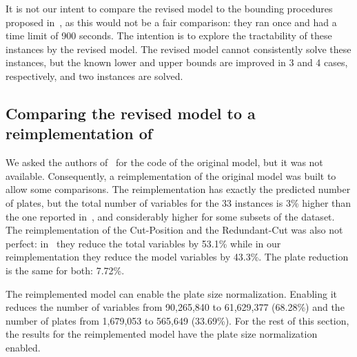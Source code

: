 \documentclass[smallextended]{svjour3}       %
\begin{document}
It is not our intent to compare the revised model to the bounding procedures proposed in~\cite{velasco:2019}, as this would not be a fair comparison: they ran once and had a time limit of 900 seconds.
The intention is to explore the tractability of these instances by the revised model.
The revised model cannot consistently solve these instances, but the known lower and upper bounds are improved in 3 and 4 cases, respectively, and two instances are solved.


\subsection{Comparing the revised model to a reimplementation of~\cite{furini:2016}}

We asked the authors of~\cite{furini:2016} for the code of the original model, but it was not available.
Consequently, a reimplementation of the original model was built to allow some comparisons.
The reimplementation has exactly the predicted number of plates, but the total number of variables for the 33 instances is 3\% higher than the one reported in~\cite{furini:2016}, and considerably higher for some subsets of the dataset.
The reimplementation of the Cut-Position and the Redundant-Cut was also not perfect: in~\cite{dimitri_thesis} they reduce the total variables by 53.1\% while in our reimplementation they reduce the model variables by 43.3\%.
The plate reduction is the same for both: 7.72\%.

The reimplemented model can enable the plate size normalization.
Enabling it reduces the number of variables from 90,265,840 to 61,629,377 (68.28\%) and the number of plates from 1,679,053 to 565,649 (33.69\%).
For the rest of this section, the results for the reimplemented model have the plate size normalization enabled.
\end{document}
